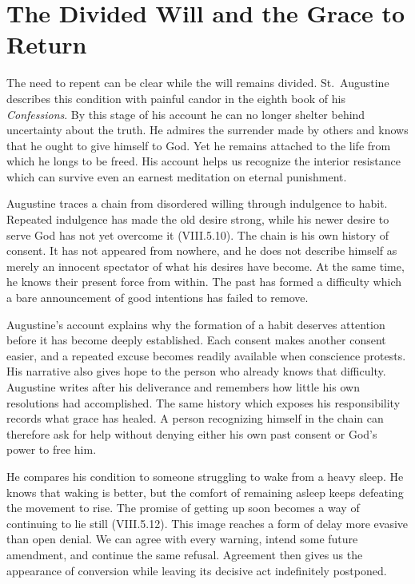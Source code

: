 \section{The Divided Will and the Grace to Return}

The need to repent can be clear while the will remains divided. St.~Augustine describes this condition with painful candor in the eighth book of his \emph{Confessions}. By this stage of his account he can no longer shelter behind uncertainty about the truth. He admires the surrender made by others and knows that he ought to give himself to God. Yet he remains attached to the life from which he longs to be freed. His account helps us recognize the interior resistance which can survive even an earnest meditation on eternal punishment.

Augustine traces a chain from disordered willing through indulgence to habit. Repeated indulgence has made the old desire strong, while his newer desire to serve God has not yet overcome it (VIII.5.10). The chain is his own history of consent. It has not appeared from nowhere, and he does not describe himself as merely an innocent spectator of what his desires have become. At the same time, he knows their present force from within. The past has formed a difficulty which a bare announcement of good intentions has failed to remove.

Augustine's account explains why the formation of a habit deserves attention before it has become deeply established. Each consent makes another consent easier, and a repeated excuse becomes readily available when conscience protests. His narrative also gives hope to the person who already knows that difficulty. Augustine writes after his deliverance and remembers how little his own resolutions had accomplished. The same history which exposes his responsibility records what grace has healed. A person recognizing himself in the chain can therefore ask for help without denying either his own past consent or God's power to free him.

He compares his condition to someone struggling to wake from a heavy sleep. He knows that waking is better, but the comfort of remaining asleep keeps defeating the movement to rise. The promise of getting up soon becomes a way of continuing to lie still (VIII.5.12). This image reaches a form of delay more evasive than open denial. We can agree with every warning, intend some future amendment, and continue the same refusal. Agreement then gives us the appearance of conversion while leaving its decisive act indefinitely postponed.

